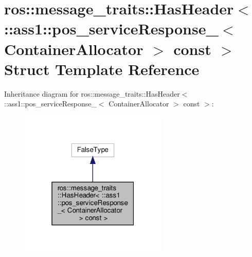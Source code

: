 \hypertarget{structros_1_1message__traits_1_1HasHeader_3_01_1_1ass1_1_1pos__serviceResponse___3_01ContainerAllocator_01_4_01const_01_4}{}\section{ros\+:\+:message\+\_\+traits\+:\+:Has\+Header$<$ \+:\+:ass1\+:\+:pos\+\_\+service\+Response\+\_\+$<$ Container\+Allocator $>$ const $>$ Struct Template Reference}
\label{structros_1_1message__traits_1_1HasHeader_3_01_1_1ass1_1_1pos__serviceResponse___3_01ContainerAllocator_01_4_01const_01_4}


Inheritance diagram for ros\+:\+:message\+\_\+traits\+:\+:Has\+Header$<$ \+:\+:ass1\+:\+:pos\+\_\+service\+Response\+\_\+$<$ Container\+Allocator $>$ const $>$\+:
\nopagebreak
\begin{figure}[H]
\begin{center}
\leavevmode
\includegraphics[width=199pt]{structros_1_1message__traits_1_1HasHeader_3_01_1_1ass1_1_1pos__serviceResponse___3_01ContainerAlb8136f12ae599dfc3a64f141d86c6d18}
\end{center}
\end{figure}


